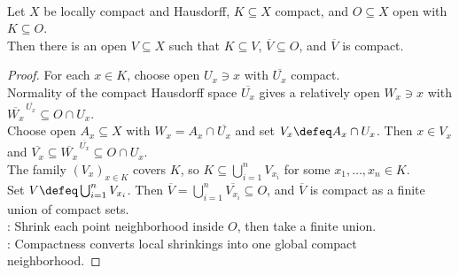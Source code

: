 \begin{proposition} \label{prop:lch-compact-neighborhood-shrinking} \\
Let $X$ be locally compact and Hausdorff, $K\subseteq X$ compact, and $O\subseteq X$ open with $K\subseteq O$.\\
Then there is an open $V\subseteq X$ such that $K\subseteq V$, $\overline{V}\subseteq O$, and $\overline{V}$ is compact.
\begin{proof} For each $x\in K$, choose open $U_x\ni x$ with $\overline{U_x}$ compact.\\
Normality of the compact Hausdorff space $\overline{U_x}$ gives a relatively open $W_x\ni x$ with $\overline{W_x}^{\,\overline{U_x}}\subseteq O\cap U_x$.\\
Choose open $A_x\subseteq X$ with $W_x=A_x\cap\overline{U_x}$ and set $V_x\defeq A_x\cap U_x$. Then $x\in V_x$ and $\overline{V_x}\subseteq\overline{W_x}^{\,\overline{U_x}}\subseteq O\cap U_x$.\\
The family $(V_x)_{x\in K}$ covers $K$, so $K\subseteq\bigcup_{i=1}^nV_{x_i}$ for some $x_1,\ldots,x_n\in K$.\\
Set $V\defeq\bigcup_{i=1}^nV_{x_i}$. Then $\overline{V}=\bigcup_{i=1}^n\overline{V_{x_i}}\subseteq O$, and $\overline{V}$ is compact as a finite union of compact sets.\\
: Shrink each point neighborhood inside $O$, then take a finite union.\\
: Compactness converts local shrinkings into one global compact neighborhood.
\end{proof}
\end{proposition}

